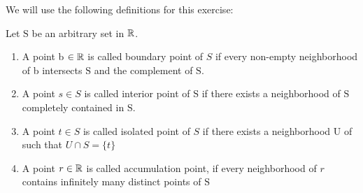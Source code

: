We will use the following definitions for this exercise:
\begin{defi} Let \(\mathrm{S}\) be an arbitrary set in \(\mathbb{R}\). 
    \begin{enumerate}
        \item A point b \(\in \mathbb{R}\) is called boundary point of \(S\) if every non-empty neighborhood of b intersects \(\mathrm{S}\) and the complement of \(\mathrm{S}\). 
        \item A point \(s \in S\) is called interior point of \(\mathrm{S}\) if there exists a neighborhood of \(\mathrm{S}\) completely contained in \(\mathrm{S}\). 
        \item A point \(t \in S\) is called isolated point of \(S\) if there exists a neighborhood U of such that \(U \cap S=\{t\}\)
        \item A point \(r \in \mathbb{R}\) is called accumulation point, if every neighborhood of \(r\) contains infinitely many distinct points of \(\mathrm{S}\)
    \end{enumerate}
\end{defi}


